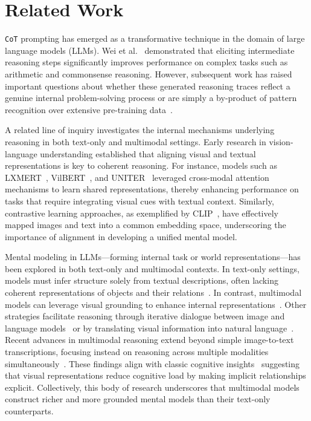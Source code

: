 \section{Related Work}
\texttt{CoT} prompting has emerged as a transformative technique in the domain of large language models (LLMs). Wei et al.~\cite{cot} demonstrated that eliciting intermediate reasoning steps significantly improves performance on complex tasks such as arithmetic and commonsense reasoning. However, subsequent work has raised important questions about whether these generated reasoning traces reflect a genuine internal problem-solving process or are simply a by-product of pattern recognition over extensive pre-training data~\cite{turpin2023,epflfaithfulness}.

A related line of inquiry investigates the internal mechanisms underlying reasoning in both text-only and multimodal settings. Early research in vision-language understanding established that aligning visual and textual representations is key to coherent reasoning. For instance, models such as LXMERT~\cite{tan-bansal-2019-lxmert}, VilBERT~\cite{lu2019vilbert}, and UNITER~\cite{chen2020uniter} leveraged cross-modal attention mechanisms to learn shared representations, thereby enhancing performance on tasks that require integrating visual cues with textual context. Similarly, contrastive learning approaches, as exemplified by CLIP~\cite{radford2021learning}, have effectively mapped images and text into a common embedding space, underscoring the importance of alignment in developing a unified mental model.

Mental modeling in LLMs—forming internal task or world representations—has been explored in both text-only and multimodal contexts. In text-only settings, models must infer structure solely from textual descriptions, often lacking coherent representations of objects and their relations~\cite{gu2023}. In contrast, multimodal models can leverage visual grounding to enhance internal representations~\cite{gao2024}. Other strategies facilitate reasoning through iterative dialogue between image and language models~\cite{zeng2022socratic} or by translating visual information into natural language~\cite{lu22, mmcot}. Recent advances in multimodal reasoning extend beyond simple image-to-text transcriptions, focusing instead on reasoning across multiple modalities simultaneously~\cite{mvot}. 
These findings align with classic cognitive insights~\cite{larkin1987diagram} suggesting that visual representations reduce cognitive load by making implicit relationships explicit. Collectively, this body of research underscores that multimodal models construct richer and more grounded mental models than their text-only counterparts.

